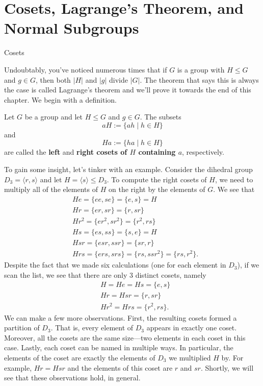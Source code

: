 \chapter{Cosets, Lagrange's Theorem, and Normal Subgroups}
\label{chapter:cosets_lagrange_normal}
\thispagestyle{empty}

\begin{section}{Cosets}

Undoubtably, you've noticed numerous times that if $G$ is a group with $H\leq G$ and $g\in G$, then both $|H|$ and $|g|$ divide $|G|$.  The theorem that says this is always the case is called Lagrange's theorem and we'll prove it towards the end of this chapter.  We begin with a definition.

\begin{definition}
Let $G$ be a group and let $H\leq G$ and $g\in G$.  The subsets
\[
aH:=\{ah\mid h\in H\}
\]
and
\[
Ha:=\{ha\mid h\in H\}
\]
are called the \textbf{left} and \textbf{right cosets of $H$ containing $a$}, respectively.
\end{definition}

To gain some insight, let's tinker with an example.  Consider the dihedral group $D_3=\langle r,s\rangle$ and let $H=\langle s\rangle\leq D_3$.  To compute the right cosets of $H$, we need to multiply all of the elements of $H$ on the right by the elements of $G$.  We see that
\begin{align*}
& He =\{ee,se\}=\{e,s\}=H\\
& Hr=\{er,sr\}=\{r,sr\}\\
& Hr^2=\{er^2,sr^2\}=\{r^2,rs\}\\
& Hs=\{es,ss\}=\{s,e\}=H\\
& Hsr=\{esr,ssr\}=\{sr,r\}\\
& Hrs=\{ers,srs\}=\{rs,ssr^2\}=\{rs,r^2\}.
\end{align*}
Despite the fact that we made six calculations (one for each element in $D_3$), if we scan the list, we see that there are only 3 distinct cosets, namely
\begin{align*}
& H=He=Hs=\{e,s\}\\
& Hr=Hsr=\{r,sr\}\\
& Hr^2=Hrs=\{r^2,rs\}.
\end{align*}
We can make a few more observations.  First, the resulting cosets formed a partition of $D_3$.  That is, every element of $D_3$ appears in exactly one coset.  Moreover, all the cosets are the same size---two elements in each coset in this case.  Lastly, each coset can be named in multiple ways.  In particular, the elements of the coset are exactly the elements of $D_3$ we multiplied $H$ by.  For example, $Hr=Hsr$ and the elements of this coset are $r$ and $sr$.  Shortly, we will see that these observations hold, in general.


\end{section}
